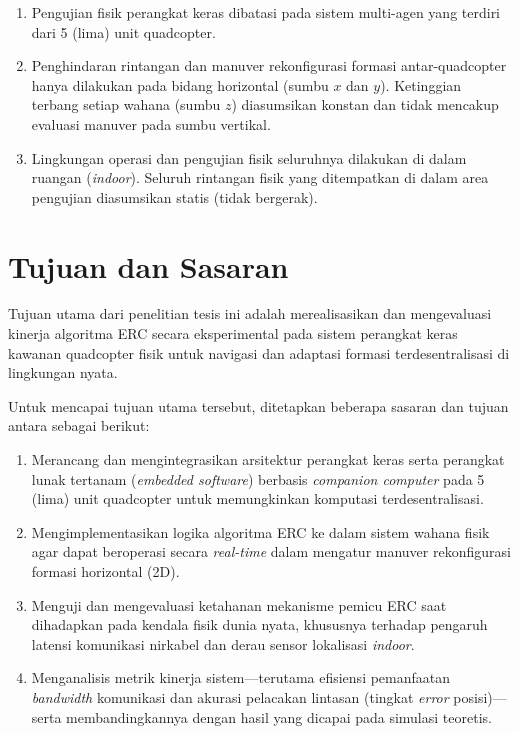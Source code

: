 \documentclass[12pt,a4paper]{report}
\numberwithin{equation}{chapter}
\begin{document}
\begin{enumerate}
    \item Pengujian fisik perangkat keras dibatasi pada sistem multi-agen yang terdiri dari 5 (lima) unit quadcopter.
    \item Penghindaran rintangan dan manuver rekonfigurasi formasi antar-quadcopter hanya dilakukan pada bidang horizontal (sumbu $x$ dan $y$). Ketinggian terbang setiap wahana (sumbu $z$) diasumsikan konstan dan tidak mencakup evaluasi manuver pada sumbu vertikal.
    \item Lingkungan operasi dan pengujian fisik seluruhnya dilakukan di dalam ruangan (\textit{indoor}). Seluruh rintangan fisik yang ditempatkan di dalam area pengujian diasumsikan statis (tidak bergerak).
\end{enumerate}

\section{Tujuan dan Sasaran}
Tujuan utama dari penelitian tesis ini adalah merealisasikan dan mengevaluasi kinerja algoritma ERC secara eksperimental pada sistem perangkat keras kawanan quadcopter fisik untuk navigasi dan adaptasi formasi terdesentralisasi di lingkungan nyata.

Untuk mencapai tujuan utama tersebut, ditetapkan beberapa sasaran dan tujuan antara sebagai berikut:

\begin{enumerate}
    \item Merancang dan mengintegrasikan arsitektur perangkat keras serta perangkat lunak tertanam (\textit{embedded software}) berbasis \textit{companion computer} pada 5 (lima) unit quadcopter untuk memungkinkan komputasi terdesentralisasi.
    \item Mengimplementasikan logika algoritma ERC ke dalam sistem wahana fisik agar dapat beroperasi secara \textit{real-time} dalam mengatur manuver rekonfigurasi formasi horizontal (2D).
    \item Menguji dan mengevaluasi ketahanan mekanisme pemicu ERC saat dihadapkan pada kendala fisik dunia nyata, khususnya terhadap pengaruh latensi komunikasi nirkabel dan derau sensor lokalisasi \textit{indoor}.
    \item Menganalisis metrik kinerja sistem---terutama efisiensi pemanfaatan \textit{bandwidth} komunikasi dan akurasi pelacakan lintasan (tingkat \textit{error} posisi)---serta membandingkannya dengan hasil yang dicapai pada simulasi teoretis.
\end{enumerate}
\end{document}
